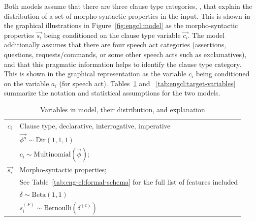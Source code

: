 Both models assume that there are three clause type categories, \diis{}, that explain the distribution of a set of morpho-syntactic properties in the input. This is shown in the graphical illustrations in Figure~\ref{fig:engcl:model} as the morpho-syntactic properties $\vec{s_{i}}$ being conditioned on the clause type variable $\vec{c_{i}}$. The \plearnerabbr{} model additionally assumes that there are four speech act categories (assertions, questions, requests/commands, or some other speech acts such as exclamatives), and that this pragmatic information helps to identify the clause type category. This is shown in the graphical representation as the variable $c_{i}$ being conditioned on the variable $a_{i}$ (for speech act). Tables~\ref{tab:engcl:baseline-variables} and ~\ref{tab:engcl:target-variables} summarize the notation and statistical assumptions for the two models. 

\begin{table}[H]
    \centering
    \begin{tabular}{cl}
    \hline
    \hline
        $c_{i}$ &  Clause type, declarative, interrogative, imperative\\
        &$\vec{\phi^{a}} \sim \mbox{Dir}(1,1,1)$\\        
        & $ c_{i} \sim  \mbox{Multinomial}(\vec{\phi})$;\\
\hline
        $\vec{s_{i}}$ &  Morpho-syntactic properties; \\
        & See Table~\ref{tab:eng-cl:formal-schema} for the full list of features included \\
        &$\delta\sim \mbox{Beta}(1,1)$\\        
        & $s_{i}^{(F)} \sim \mbox{Bernoulli}(\delta^{(c)})$ \\
    \hline
    \hline
    \end{tabular}
    \caption{Variables in \distlearner{} model, their distribution, and explanation}
    \label{tab:engcl:baseline-variables}
\end{table}


